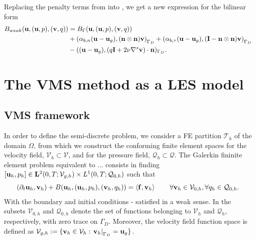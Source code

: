 Replacing the penalty terms from  into , we get a new expression for the bilinear form
\begin{align}
\label{eq-C7_bilinear_weak_by_components}
B_{weak}({\bf u},({\bf u},p),({\bf v},q))&=B_\Gamma({\bf u},({\bf u},p),({\bf v},q))\\\nonumber
&+\left(\alpha_{b,n}({\bf u}-{\bf u}_g),({\bf n}\otimes{\bf n}){\bf v}\right)_{\Gamma_D}+\left(\alpha_{b,\tau}({\bf u}-{\bf u}_g),(\mathbf{I}-{\bf n}\otimes{\bf n}){\bf v}\right)_{\Gamma_D}\\\nonumber
&-(({\bf u}-{\bf u}_g),(q\mathbf{I}+2\nu\nabla^s{\bf v})\cdot{\bf n})_{\Gamma_D}.
\end{align}

\section{The VMS method as a LES model}
\label{sec-C7_VMS}
\subsection{VMS framework}
In order to define the semi-discrete problem, we consider a FE partition $ \mathcal{T}_h $ of the domain $ \Omega $, from which we construct the conforming finite element spaces for the velocity field, $ \mathcal{V}_h\subset\mathcal{V} $, and for the pressure field, $ \mathcal{Q}_h\subset\mathcal{Q} $. The Galerkin fininite element problem equivalent to ... consists in finding $[{\bf u}_h,p_h]\in\mathbf{L}^2(0,T;\mathcal{V}_{g,h})\times L^1(0,T;\mathcal{Q}_{0,h})$ such that
\begin{equation}
\label{eq-C7_NS_galerkin}
(\partial_t{\bf u}_h,{\bf v}_h)+B({\bf u}_h,({\bf u}_h,p_h),({\bf v}_h,q_h)) =\left<{\bf f},{\bf v}_h\right>
\quad\quad\forall{\bf v}_h\in\mathcal{V}_{0,h},\forall q_h\in\mathcal{Q}_{0,h}.
\end{equation}
With the boundary and initial conditions - satisfied in a weak sense. In  the subsets $ \mathcal{V}_{0,h} $ and $ \mathcal{Q}_{0,h} $ denote the set of functions belonging to $ \mathcal{V}_h $ and $ \mathcal{Q}_h $, respectively, with zero trace on $ \Gamma_D $. Moreover, the velocity field function space is defined as $ \mathcal{V}_{g,h}:=\lbrace{\bf v}_h\in\mathcal{V}_h: \left.{\bf v}_h\right|_{\Gamma_D}={\bf u}_g\rbrace $.

